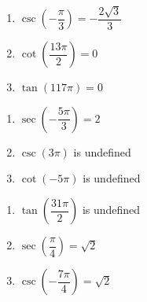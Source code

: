 \begin{multicols}{3}

\begin{enumerate}

\setcounter{enumi}{\value{HW}}

\item $\csc \left( -\dfrac{\pi}{3} \right) = -\dfrac{2\sqrt{3}}{3}$
\item $\cot \left( \dfrac{13\pi}{2} \right) = 0$
\item $\tan \left( 117\pi \right) = 0$ 

\setcounter{HW}{\value{enumi}}

\end{enumerate}

\end{multicols}

\begin{multicols}{3}

\begin{enumerate}

\setcounter{enumi}{\value{HW}}

\item $\sec \left( -\dfrac{5\pi}{3} \right) = 2$
\item $\csc \left( 3\pi \right)$ is undefined 
\item $\cot \left( -5\pi \right)$ is undefined 

\setcounter{HW}{\value{enumi}}

\end{enumerate}

\end{multicols}

\begin{multicols}{3}

\begin{enumerate}

\setcounter{enumi}{\value{HW}}

\item $\tan \left( \dfrac{31\pi}{2} \right)$ is undefined
\item $\sec \left( \dfrac{\pi}{4} \right) = \sqrt{2}$ 
\item $\csc \left( -\dfrac{7\pi}{4} \right) = \sqrt{2}$

\setcounter{HW}{\value{enumi}}

\end{enumerate}

\end{multicols}

